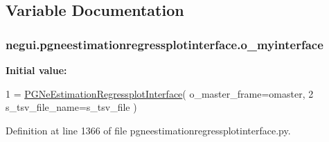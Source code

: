 \subsection{Variable Documentation}
\subsubsection[{\texorpdfstring{o\+\_\+myinterface}{o_myinterface}}]{\setlength{\rightskip}{0pt plus 5cm}negui.\+pgneestimationregressplotinterface.\+o\+\_\+myinterface}\hypertarget{namespacenegui_1_1pgneestimationregressplotinterface_a788b22a1e2b4b363b2e16b92660ea197}{}\label{namespacenegui_1_1pgneestimationregressplotinterface_a788b22a1e2b4b363b2e16b92660ea197}
{\bfseries Initial value\+:}
\begin{DoxyCode}
1 = \hyperlink{classnegui_1_1pgneestimationregressplotinterface_1_1PGNeEstimationRegressplotInterface}{PGNeEstimationRegressplotInterface}( o\_master\_frame=omaster,
2                                                     s\_tsv\_file\_name=s\_tsv\_file )
\end{DoxyCode}


Definition at line 1366 of file pgneestimationregressplotinterface.\+py.

